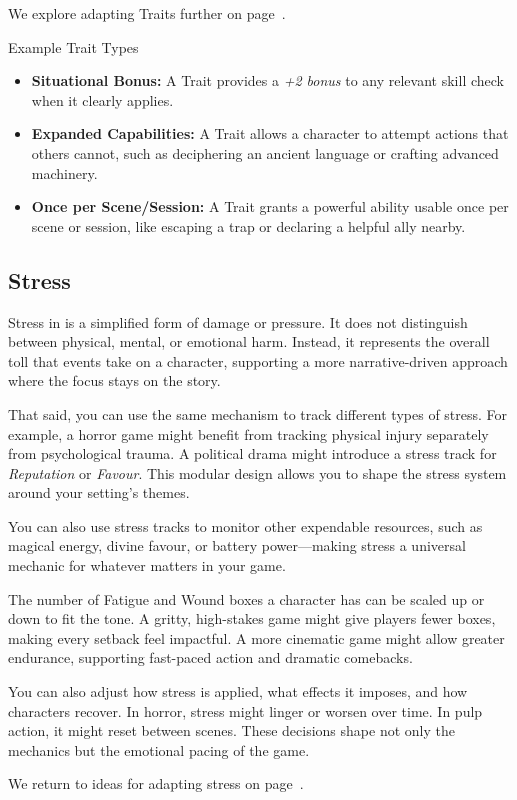 We explore adapting Traits further on page~\pageref{toolbox:sec:adapting-traits}.

\begin{CommentBox}{Example Trait Types}
    \begin{itemize}
        \item \textbf{Situational Bonus:} A Trait provides a \emph{+2 bonus} to any relevant skill check when it clearly applies.
        \item \textbf{Expanded Capabilities:} A Trait allows a character to attempt actions that others cannot, such as deciphering an ancient language or crafting advanced machinery.
        \item \textbf{Once per Scene/Session:} A Trait grants a powerful ability usable once per scene or session, like escaping a trap or declaring a helpful ally nearby.
    \end{itemize}
\end{CommentBox}

\subsection{Stress}

Stress in \wyrd is a simplified form of damage or pressure. It does not distinguish between physical, mental, or emotional harm. Instead, it represents the overall toll that events take on a character, supporting a more narrative-driven approach where the focus stays on the story.

That said, you can use the same mechanism to track different types of stress. For example, a horror game might benefit from tracking physical injury separately from psychological trauma. A political drama might introduce a stress track for \textit{Reputation} or \textit{Favour}. This modular design allows you to shape the stress system around your setting’s themes.

You can also use stress tracks to monitor other expendable resources, such as magical energy, divine favour, or battery power—making stress a universal mechanic for whatever matters in your game.

The number of Fatigue and Wound boxes a character has can be scaled up or down to fit the tone. A gritty, high-stakes game might give players fewer boxes, making every setback feel impactful. A more cinematic game might allow greater endurance, supporting fast-paced action and dramatic comebacks.

You can also adjust how stress is applied, what effects it imposes, and how characters recover. In horror, stress might linger or worsen over time. In pulp action, it might reset between scenes. These decisions shape not only the mechanics but the emotional pacing of the game.

We return to ideas for adapting stress on page~\pageref{toolbox:sec:adapting-stress}.
